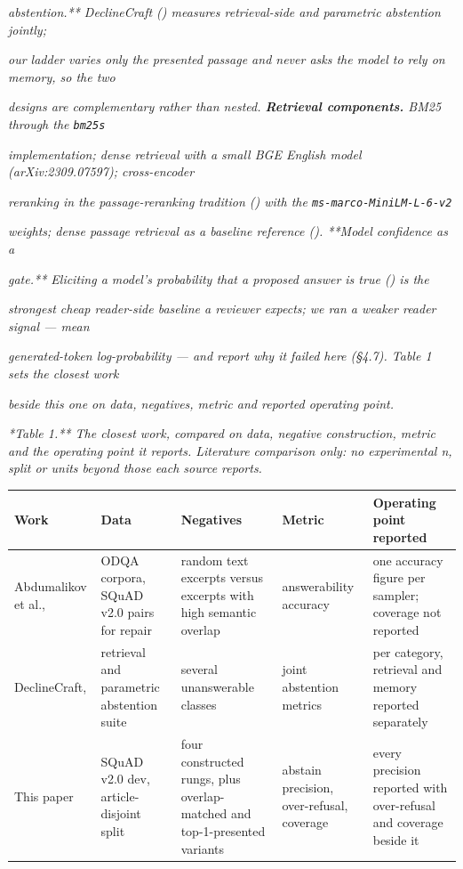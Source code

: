 \textit{abstention.** DeclineCraft (\citep{declinecraft-a-rag-abstention-benchmark-for-jointly-measurin}) measures retrieval-side and parametric abstention jointly;}

\textit{our ladder varies only the presented passage and never asks the model to rely on memory, so the two}

\textit{designs are complementary rather than nested. \textbf{Retrieval components.} BM25 through the \texttt{bm25s}}

\textit{implementation; dense retrieval with a small BGE English model (arXiv:2309.07597); cross-encoder}

\textit{reranking in the passage-reranking tradition (\citep{passage-re-ranking-with-bert}) with the \texttt{ms-marco-MiniLM-L-6-v2}}

\textit{weights; dense passage retrieval as a baseline reference (\citep{dense-passage-retrieval-for-open-domain-question-answering}). **Model confidence as a}

\textit{gate.** Eliciting a model's probability that a proposed answer is true (\citep{language-models-mostly-know-what-they-know}) is the}

\textit{strongest cheap reader-side baseline a reviewer expects; we ran a weaker reader signal --- mean}

\textit{generated-token log-probability --- and report why it failed here (§4.7). Table 1 sets the closest work}

\textit{beside this one on data, negatives, metric and reported operating point.}

\textit{*Table 1.** The closest work, compared on data, negative construction, metric and the operating point it reports. Literature comparison only: no experimental n, split or units beyond those each source reports.}

\begin{table}[t]
\centering
\scriptsize
  \begin{tabularx}{\textwidth}{lXXXX}
    \toprule
    Work & Data & Negatives & Metric & Operating point reported \\
\midrule
    Abdumalikov et al., \citep{answerability-in-retrieval-augmented-open-domain-question-an} & ODQA corpora, SQuAD v2.0 pairs for repair & random text excerpts versus excerpts with high semantic overlap & answerability accuracy & one accuracy figure per sampler; coverage not reported \\
    DeclineCraft, \citep{declinecraft-a-rag-abstention-benchmark-for-jointly-measurin} & retrieval and parametric abstention suite & several unanswerable classes & joint abstention metrics & per category, retrieval and memory reported separately \\
    This paper & SQuAD v2.0 dev, article-disjoint split & four constructed rungs, plus overlap-matched and top-1-presented variants & abstain precision, over-refusal, coverage & every precision reported with over-refusal and coverage beside it \\
    \bottomrule
  \end{tabularx}
\end{table}
